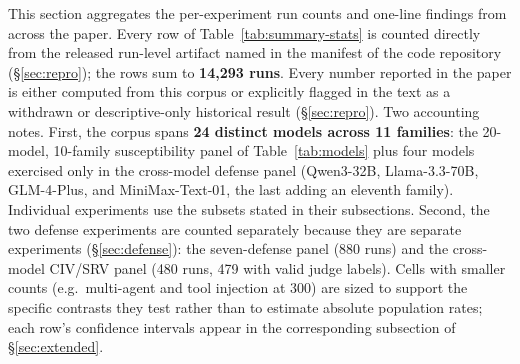 \documentclass{article}
\theoremstyle{plain}
\theoremstyle{definition}
\begin{document}
This section aggregates the per-experiment run counts and one-line findings from across the paper. Every row of Table~\ref{tab:summary-stats} is counted directly from the released run-level artifact named in the manifest of the code repository (\S\ref{sec:repro}); the rows sum to \textbf{14{,}293 runs}. Every number reported in the paper is either computed from this corpus or explicitly flagged in the text as a withdrawn or descriptive-only historical result (\S\ref{sec:repro}). Two accounting notes. First, the corpus spans \textbf{24 distinct models across 11 families}: the 20-model, 10-family susceptibility panel of Table~\ref{tab:models} plus four models exercised only in the cross-model defense panel (Qwen3-32B, Llama-3.3-70B, GLM-4-Plus, and MiniMax-Text-01, the last adding an eleventh family). Individual experiments use the subsets stated in their subsections. Second, the two defense experiments are counted separately because they are separate experiments (\S\ref{sec:defense}): the seven-defense panel (880 runs) and the cross-model CIV/SRV panel (480 runs, 479 with valid judge labels). Cells with smaller counts (e.g.\ multi-agent and tool injection at 300) are sized to support the specific contrasts they test rather than to estimate absolute population rates; each row's confidence intervals appear in the corresponding subsection of \S\ref{sec:extended}.
\end{document}
